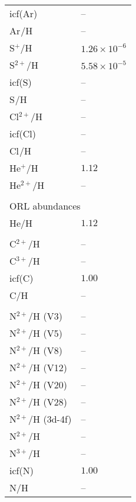 \begin{longtable}[l]{ll}
 icf(Ar)                             & -- \\
 Ar$^{}$/H                           & -- \\
 S$^{+}$/H                           & $  1.26\times 10^{ -6}$\\
 S$^{2+}$/H                          & $  5.58\times 10^{ -5}$\\
 icf(S)                              & -- \\
 S$^{}$/H                            & -- \\
 Cl$^{2+}$/H                         & -- \\
 icf(Cl)                             & -- \\
 Cl$^{}$/H                           & -- \\
 He$^{+}$/H                          & $  1.12$\\
 He$^{2+}$/H                         & -- \\
 \vspace{0.2cm}\\\multicolumn{2}{l}{ORL abundances}\\ \hline
 He/H                                & $  1.12$\\
 \\
 C$^{2+}$/H                          & -- \\
 C$^{3+}$/H                          & -- \\
 icf(C)                              & $  1.00$\\
 C/H                                 & -- \\
 \\
 N$^{2+}$/H (V3)                     & -- \\
 N$^{2+}$/H (V5)                     & -- \\
 N$^{2+}$/H (V8)                     & -- \\
 N$^{2+}$/H (V12)                    & -- \\
 N$^{2+}$/H (V20)                    & -- \\
 N$^{2+}$/H (V28)                    & -- \\
 N$^{2+}$/H (3d-4f)                  & -- \\
 N$^{2+}$/H                          & -- \\
 N$^{3+}$/H                          & -- \\
 icf(N)                              & $  1.00$\\
 N/H                                 & -- \\

\end{longtable}
